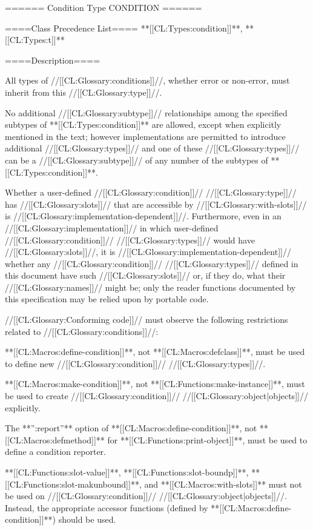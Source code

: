====== Condition Type CONDITION ======


====Class Precedence List====
**[[CL:Types:condition]]**, **[[CL:Types:t]]**

====Description====

All types of //[[CL:Glossary:conditions]]//, whether error or non-error, must inherit from this //[[CL:Glossary:type]]//.

No additional //[[CL:Glossary:subtype]]// relationships among the specified subtypes of **[[CL:Types:condition]]** are allowed, except when explicitly mentioned in the text; however implementations are permitted to introduce additional //[[CL:Glossary:types]]// and one of these //[[CL:Glossary:types]]// can be a //[[CL:Glossary:subtype]]// of any number of the subtypes of **[[CL:Types:condition]]**.

Whether a user-defined //[[CL:Glossary:condition]]// //[[CL:Glossary:type]]// has //[[CL:Glossary:slots]]// that are accessible by //[[CL:Glossary:with-slots]]// is //[[CL:Glossary:implementation-dependent]]//. Furthermore, even in an //[[CL:Glossary:implementation]]// in which user-defined //[[CL:Glossary:condition]]// //[[CL:Glossary:types]]// would have //[[CL:Glossary:slots]]//, it is //[[CL:Glossary:implementation-dependent]]// whether any //[[CL:Glossary:condition]]// //[[CL:Glossary:types]]// defined in this document have such //[[CL:Glossary:slots]]// or, if they do, what their //[[CL:Glossary:names]]// might be; only the reader functions documented by this specification may be relied upon by portable code.

//[[CL:Glossary:Conforming code]]// must observe the following restrictions related to //[[CL:Glossary:conditions]]//:

\beginlist \itemitem{\bull} **[[CL:Macros:define-condition]]**, not **[[CL:Macros:defclass]]**, must be used to define new //[[CL:Glossary:condition]]// //[[CL:Glossary:types]]//.

\itemitem{\bull} **[[CL:Macros:make-condition]]**, not **[[CL:Functions:make-instance]]**, must be used to create //[[CL:Glossary:condition]]// //[[CL:Glossary:object|objects]]// explicitly.

\itemitem{\bull} The **'':report''** option of **[[CL:Macros:define-condition]]**, not **[[CL:Macros:defmethod]]** for **[[CL:Functions:print-object]]**, must be used to define a condition reporter.

\itemitem{\bull} **[[CL:Functions:slot-value]]**, **[[CL:Functions:slot-boundp]]**, **[[CL:Functions:slot-makunbound]]**, and **[[CL:Macros:with-slots]]** must not be used on //[[CL:Glossary:condition]]// //[[CL:Glossary:object|objects]]//. Instead, the appropriate accessor functions (defined by **[[CL:Macros:define-condition]]**) should be used. \endlist

    
